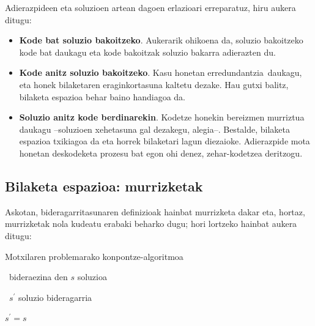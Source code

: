 \documentclass[eu]{ifirak}\usepackage[]{graphicx}\usepackage[]{color}
\newcommand{\zkk}{\guillemotleft}
\newcommand{\skk}{\guillemotright}
\begin{document}
Adierazpideen eta soluzioen artean dagoen erlazioari erreparatuz, hiru aukera ditugu:

\begin{itemize}
\item \textbf{Kode bat soluzio bakoitzeko}. Aukerarik ohikoena da, soluzio bakoitzeko kode bat daukagu eta kode bakoitzak soluzio bakarra adierazten du.
\item \textbf{Kode anitz soluzio bakoitzeko}. Kasu honetan \zkk erredundantzia\skk\ daukagu, eta honek bilaketaren eraginkortasuna kaltetu dezake. Hau gutxi balitz, bilaketa espazioa behar baino handiagoa da.
\item \textbf{Soluzio anitz kode berdinarekin}. Kodetze honekin bereizmen murriztua daukagu --soluzioen xehetasuna gal dezakegu, alegia--. Bestalde, bilaketa espazioa txikiagoa da eta horrek bilaketari lagun diezaioke. Adierazpide mota honetan deskodeketa prozesu bat egon ohi denez, zehar-kodetzea deritzogu.
\end{itemize}

\subsection{Bilaketa espazioa: murrizketak}

Askotan, bideragarritasunaren definizioak hainbat murrizketa dakar eta, hortaz, murrizketak nola kudeatu erabaki beharko dugu; hori lortzeko hainbat aukera ditugu:

\begin{ifalgorithm}[t]
\begin{ifpseudo}{Motxilaren problemarako konpontze-algoritmoa}
\item \In\ bideraezina den $s$ soluzioa
\item \In\ $s^\prime$ soluzio bideragarria
\item $s^\prime = s$
\item {}
\item {}
\item {}
\item \Done
\end{ifpseudo}
\caption{Motxilaren problemarako bideragarriak ez diren soluzioak konpontzeko prozedura bat}\label{alg:motxila_problema_konpontzea}
\end{ifalgorithm}
\end{document}
